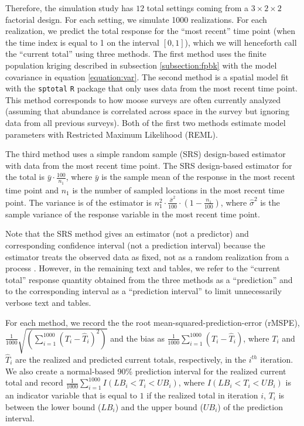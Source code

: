 \documentclass[]{interact}
\theoremstyle{plain}%
\theoremstyle{definition}
\theoremstyle{remark}
\begin{document}
Therefore, the simulation study has \(12\) total settings coming from a
\(3 \times 2 \times 2\) factorial design. For each setting, we simulate
1000 realizations. For each realization, we predict the total response
for the ``most recent'' time point (when the time index is equal to 1 on
the interval \([0, 1]\)), which we will henceforth call the ``current
total'' using three methods. The first method uses the finite population
kriging described in subsection \ref{subsection:fpbk} with the model
covariance in equation \ref{equation:var}. The second method is a
spatial model fit with the \texttt{sptotal} \texttt{R} package
\citep{higham2021sptotal} that only uses data from the most recent time
point. This method corresponds to how moose surveys are often currently
analyzed (assuming that abundance is correlated across space in the
survey but ignoring data from all previous surveys). Both of the first
two methods estimate model parameters with Restricted Maximum Likelihood
(REML).

The third method uses a simple random sample (SRS) design-based
estimator with data from the most recent time point. The SRS
design-based estimator for the total is
\(\bar{y} \cdot \frac{100}{n_1}\), where \(\bar{y}\) is the sample mean
of the response in the most recent time point and \(n_1\) is the number
of sampled locations in the most recent time point. The variance is of
the estimator is
\(n_1^2 \cdot \frac{\hat{\sigma}^2}{100} \cdot (1 - \frac{n_1}{100})\),
where \(\hat{\sigma}^2\) is the sample variance of the response variable
in the most recent time point.

Note that the SRS method gives an estimator (not a predictor) and
corresponding confidence interval (not a prediction interval) because
the estimator treats the observed data as fixed, not as a random
realization from a process
\citep{brus2021statistical, dumelle2022comparison}. However, in the
remaining text and tables, we refer to the ``current total'' response
quantity obtained from the three methods as a ``prediction'' and to the
corresponding interval as a ``prediction interval'' to limit
unnecessarily verbose text and tables.

For each method, we record the the root mean-squared-prediction-error
(rMSPE),
\(\frac{1}{1000}\sqrt{(\sum_{i = 1}^{1000}(T_i - \hat{T}_i)^2)}\) and
the bias as \(\frac{1}{1000}\sum_{i = 1}^{1000}(T_i - \hat{T}_i)\),
where \(T_i\) and \(\hat{T}_i\) are the realized and predicted current
totals, respectively, in the \(i^{th}\) iteration. We also create a
normal-based 90\% prediction interval for the realized current total and
record \(\frac{1}{1000} \sum_{i = 1}^{1000}I(LB_i < T_i < UB_i)\), where
\(I(LB_i < T_i < UB_i)\) is an indicator variable that is equal to \(1\)
if the realized total in iteration \(i\), \(T_i\) is between the lower
bound (\(LB_i\)) and the upper bound (\(UB_i\)) of the prediction
interval.
\end{document}
